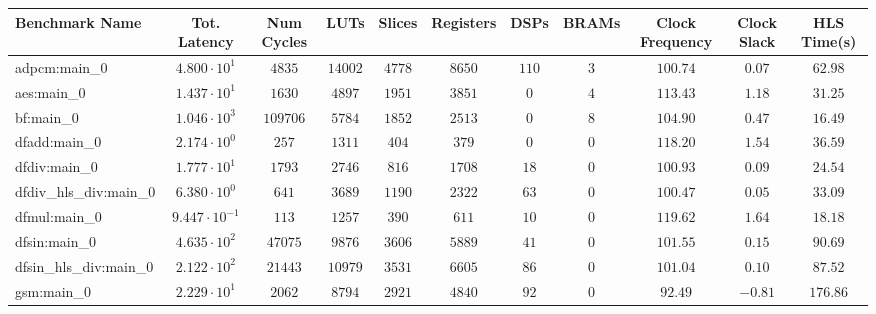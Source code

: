 \begin{tabular}{|l|c|c|c|c|c|c|c|c|c|c|}
\hline
Benchmark Name          & Tot. Latency            & Num Cycles & LUTs      & Slices    & Registers & DSPs    & BRAMs  & Clock Frequency & Clock Slack & HLS Time(s) \\
\hline
adpcm:main\_0           & $ 4.800 \cdot 10^{1}  $ & $ 4835   $ & $ 14002 $ & $ 4778  $ & $ 8650  $ & $ 110 $ & $ 3  $ & $ 100.74      $ & $ 0.07    $ & $ 62.98   $ \\
aes:main\_0             & $ 1.437 \cdot 10^{1}  $ & $ 1630   $ & $ 4897  $ & $ 1951  $ & $ 3851  $ & $ 0   $ & $ 4  $ & $ 113.43      $ & $ 1.18    $ & $ 31.25   $ \\
bf:main\_0              & $ 1.046 \cdot 10^{3}  $ & $ 109706 $ & $ 5784  $ & $ 1852  $ & $ 2513  $ & $ 0   $ & $ 8  $ & $ 104.90      $ & $ 0.47    $ & $ 16.49   $ \\
dfadd:main\_0           & $ 2.174 \cdot 10^{0}  $ & $ 257    $ & $ 1311  $ & $ 404   $ & $ 379   $ & $ 0   $ & $ 0  $ & $ 118.20      $ & $ 1.54    $ & $ 36.59   $ \\
dfdiv:main\_0           & $ 1.777 \cdot 10^{1}  $ & $ 1793   $ & $ 2746  $ & $ 816   $ & $ 1708  $ & $ 18  $ & $ 0  $ & $ 100.93      $ & $ 0.09    $ & $ 24.54   $ \\
dfdiv\_hls\_div:main\_0 & $ 6.380 \cdot 10^{0}  $ & $ 641    $ & $ 3689  $ & $ 1190  $ & $ 2322  $ & $ 63  $ & $ 0  $ & $ 100.47      $ & $ 0.05    $ & $ 33.09   $ \\
dfmul:main\_0           & $ 9.447 \cdot 10^{-1} $ & $ 113    $ & $ 1257  $ & $ 390   $ & $ 611   $ & $ 10  $ & $ 0  $ & $ 119.62      $ & $ 1.64    $ & $ 18.18   $ \\
dfsin:main\_0           & $ 4.635 \cdot 10^{2}  $ & $ 47075  $ & $ 9876  $ & $ 3606  $ & $ 5889  $ & $ 41  $ & $ 0  $ & $ 101.55      $ & $ 0.15    $ & $ 90.69   $ \\
dfsin\_hls\_div:main\_0 & $ 2.122 \cdot 10^{2}  $ & $ 21443  $ & $ 10979 $ & $ 3531  $ & $ 6605  $ & $ 86  $ & $ 0  $ & $ 101.04      $ & $ 0.10    $ & $ 87.52   $ \\
gsm:main\_0             & $ 2.229 \cdot 10^{1}  $ & $ 2062   $ & $ 8794  $ & $ 2921  $ & $ 4840  $ & $ 92  $ & $ 0  $ & $ 92.49       $ & $ -0.81   $ & $ 176.86  $ \\

\end{tabular}
